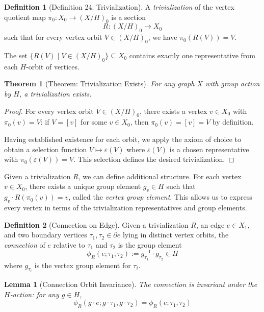 \documentclass[11pt]{article}
\theoremstyle{plain}
\newtheorem*{theorem}{Theorem}
\newtheorem*{lemma}{Lemma}
\theoremstyle{definition}
\newtheorem*{definition}{Definition}
\theoremstyle{remark}
\begin{document}
\begin{definition}[Definition 24: Trivialization]
A \emph{trivialization} of the vertex quotient map $\pi_0: X_0 \to (X/H)_0$ is a section
\[
R: (X/H)_0 \longrightarrow X_0
\]
such that for every vertex orbit $V \in (X/H)_0$, we have $\pi_0(R(V)) = V$.

The set $\{R(V) \mid V \in (X/H)_0\} \subseteq X_0$ contains exactly one representative from each $H$-orbit of vertices.
\end{definition}

\begin{theorem}[Theorem: Trivialization Exists]
For any graph $X$ with group action by $H$, a trivialization exists.
\end{theorem}

\begin{proof}
For every vertex orbit $V \in (X/H)_0$, there exists a vertex $v \in X_0$ with $\pi_0(v) = V$: if $V = [v]$ for some $v \in X_0$, then $\pi_0(v) = [v] = V$ by definition.

Having established existence for each orbit, we apply the axiom of choice to obtain a selection function $V \mapsto \varepsilon(V)$ where $\varepsilon(V)$ is a chosen representative with $\pi_0(\varepsilon(V)) = V$. This selection defines the desired trivialization.
\end{proof}

Given a trivialization $R$, we can define additional structure. For each vertex $v \in X_0$, there exists a unique group element $g_v \in H$ such that $g_v \cdot R(\pi_0(v)) = v$, called the \emph{vertex group element}. This allows us to express every vertex in terms of the trivialization representatives and group elements.

\begin{definition}[Connection on Edge]
Given a trivialization $R$, an edge $e \in X_1$, and two boundary vertices $\tau_1, \tau_2 \in \partial e$ lying in distinct vertex orbits, the \emph{connection} of $e$ relative to $\tau_1$ and $\tau_2$ is the group element
\[
\phi_R(e;\tau_1,\tau_2) := g_{\tau_1}^{-1} \cdot g_{\tau_2} \in H
\]
where $g_{\tau_i}$ is the vertex group element for $\tau_i$.
\end{definition}

\begin{lemma}[Connection Orbit Invariance]
The connection is invariant under the $H$-action: for any $g \in H$,
\[
\phi_R(g \cdot e; g \cdot \tau_1, g \cdot \tau_2) = \phi_R(e; \tau_1, \tau_2)
\]
\end{lemma}
\end{document}
